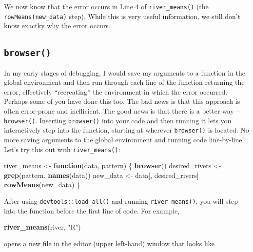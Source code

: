\documentclass[
]{book}
\newenvironment{Shaded}{\begin{snugshade}}{\end{snugshade}}
\newcommand{\ControlFlowTok}[1]{\textcolor[rgb]{0.13,0.29,0.53}{\textbf{#1}}}
\newcommand{\KeywordTok}[1]{\textcolor[rgb]{0.13,0.29,0.53}{\textbf{#1}}}
\newcommand{\NormalTok}[1]{#1}
\newcommand{\StringTok}[1]{\textcolor[rgb]{0.31,0.60,0.02}{#1}}
\begin{document}
We now know that the error occurs in Line 4 of \texttt{river\_means()} (the \texttt{rowMeans(new\_data)} step). While this is very useful information, we still don't know exactky why the error occurs.

\hypertarget{browser}{%
\subsection{\texorpdfstring{\texttt{browser()}}{browser()}}\label{browser}}

In my early stages of debugging, I would save my arguments to a function in the global environment and then run through each line of the function returning the error, effectively ``recreating'' the environment in which the error occurred. Perhaps some of you have done this too. The bad news is that this approach is often error-prone and inefficient. The good news is that there is a better way -- \texttt{browser()}. Inserting \texttt{browser()} into your code and then running it lets you interactively step into the function, starting at wherever \texttt{browser()} is located. No more saving arguments to the global environment and running code line-by-line! Let's try this out with \texttt{river\_means()}:

\begin{Shaded}
\begin{Highlighting}[]
\NormalTok{river_means <-}\StringTok{ }\ControlFlowTok{function}\NormalTok{(data, pattern) \{}
  \KeywordTok{browser}\NormalTok{()}
\NormalTok{  desired_rivers <-}\StringTok{ }\KeywordTok{grep}\NormalTok{(pattern, }\KeywordTok{names}\NormalTok{(data))}
\NormalTok{  new_data <-}\StringTok{ }\NormalTok{data[, desired_rivers]}
  \KeywordTok{rowMeans}\NormalTok{(new_data)}
\NormalTok{\}}
\end{Highlighting}
\end{Shaded}

After using \texttt{devtools::load\_all()} and running \texttt{river\_means()}, you will step into the function before the first line of code. For example,

\begin{Shaded}
\begin{Highlighting}[]
\KeywordTok{river_means}\NormalTok{(river, }\StringTok{"R"}\NormalTok{)}
\end{Highlighting}
\end{Shaded}

opens a new file in the editor (upper left-hand) window that looks like
\end{document}
